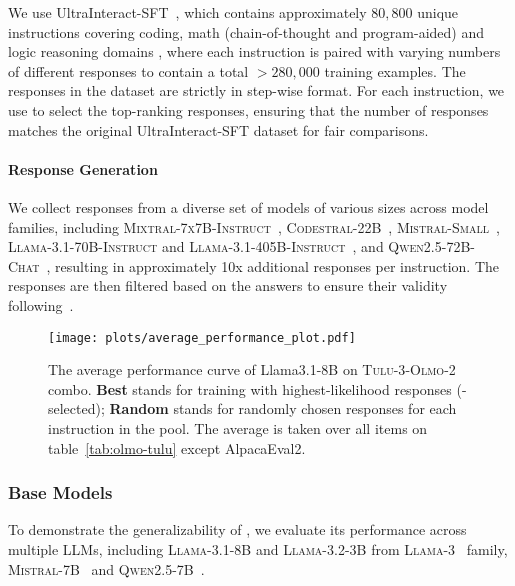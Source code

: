 We use UltraInteract-SFT~\cite{yuan2024eurus}, which contains approximately $80,800$ unique instructions covering coding, math (chain-of-thought and program-aided) and logic reasoning domains , where each instruction is paired with varying numbers of different responses to contain a total $>280,000$ training examples. The responses in the dataset are strictly in step-wise format. 
For each instruction, we use \name to select the top-ranking responses, ensuring that the number of responses matches the original UltraInteract-SFT dataset for fair comparisons.

\paragraph{Response Generation} 
We collect responses from a diverse set of models of various sizes across model families, including \textsc{Mixtral-7x7B-Instruct}~\cite{jiang2024mixtralexperts}, \textsc{Codestral-22B}~\cite{mistralai2024codestral22b}, \textsc{Mistral-Small}~\cite{mistralai2024mistralsmallinstruct}, \textsc{Llama-3.1-70B-Instruct} and \textsc{Llama-3.1-405B-Instruct}~\cite{dubey2024llama3herdmodels}, and \textsc{Qwen2.5-72B-Chat}~\cite{yang2024qwen2technicalreport}, resulting in approximately 10x additional responses per instruction. The responses are then filtered based on the answers to ensure their validity following~\citet{yuan2024eurus}.
\begin{figure}
    \centering
\texttt{[image: plots/average\_performance\_plot.pdf]}
    \caption{The average performance curve of Llama3.1-8B on \textsc{Tulu-3}-\textsc{Olmo-2} combo. \textbf{Best} stands for training with highest-likelihood responses (\name-selected);   \textbf{Random} stands for randomly chosen responses for each instruction in the pool. The average is taken over all items on table~\ref{tab:olmo-tulu} except AlpacaEval2.}
    \label{fig:overview}
\end{figure}
\subsubsection{Base Models} To demonstrate the generalizability of \name, we evaluate its performance across multiple LLMs, including \textsc{Llama-3.1-8B} and \textsc{Llama-3.2-3B} from \textsc{Llama-3}~\cite{grattafiori2024llama3herdmodels} family, \textsc{Mistral-7B}~\cite{jiang2023mistral7b} and \textsc{Qwen2.5-7B}~\cite{hui2024qwen25}.

